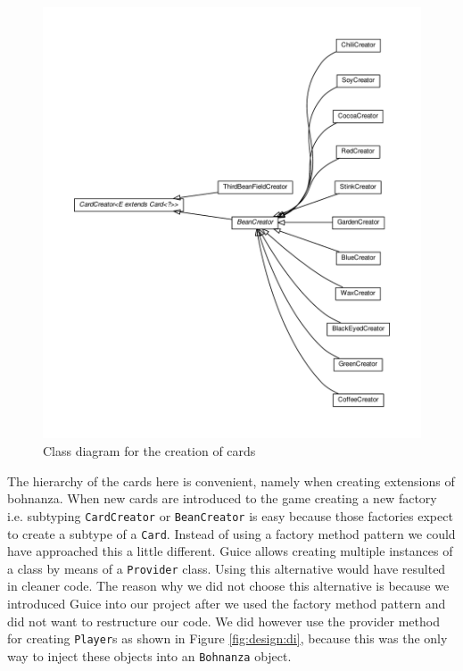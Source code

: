 \begin{figure}[h!]
    \includegraphics[width=\textwidth]{../umlgraph/CreatorGraph}
    \caption{Class diagram for the creation of cards}
    \label{fig:design:creator}
\end{figure}

The hierarchy of the cards here is convenient, namely when creating extensions of bohnanza. When new cards are introduced to the game
creating a new factory i.e. subtyping \texttt{CardCreator} or \texttt{BeanCreator} is easy because those factories expect to create a
subtype of a \texttt{Card}. Instead of using a factory method pattern we could have approached this a little different. Guice allows
creating multiple instances of a class by means of a \texttt{Provider} class. Using this alternative would have resulted in cleaner code. The reason why we
did not choose this alternative is because we introduced Guice into our project after we used the factory method pattern and did not want to
restructure our code. We did however use the provider method for creating \texttt{Player}s as shown in Figure \ref{fig:design:di}, because
this was the only way to inject these objects into an \texttt{Bohnanza} object.

